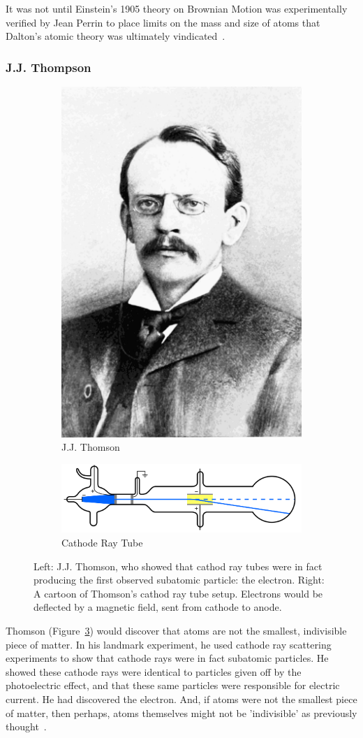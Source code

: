 It was not until Einstein's 1905 theory on Brownian Motion was experimentally
verified by Jean Perrin to place limits on the mass and size of atoms that
Dalton's atomic theory was ultimately vindicated~\cite{Patterson200750}.

\subsubsection{J.J. Thompson}

\begin{figure}[ht]
	\centering
	\begin{subfigure}{.4\textwidth}
		\centering
		\includegraphics[width=0.4\linewidth]{../Chapter2/fig/jjthomson.png}
		\caption{J.J. Thomson}
		\label{fig:thomsonportrait}
	\end{subfigure}%
	\begin{subfigure}{0.6\textwidth}
		\centering
		\includegraphics[width=0.4\linewidth]{../Chapter2/fig/cathoderaytube.png}
		\caption{Cathode Ray Tube}
		\label{fig:thomsoncathode}
	\end{subfigure}
	\caption{ 
		Left: J.J. Thomson, who showed that cathod ray tubes were in fact producing
		the first observed subatomic particle: the electron. Right: A cartoon of
		Thomson's cathod ray tube setup. Electrons would be deflected by a magnetic
		field, sent from cathode to anode.
	}
	\label{fig:jjthomson}
\end{figure}

Thomson (Figure~\ref{fig:jjthomson}) would discover that atoms are not the
smallest, indivisible piece of matter. In his landmark experiment, he used
cathode ray scattering experiments to show that cathode rays were in fact
subatomic particles. He showed these cathode rays were identical to particles
given off by the photoelectric effect, and that these same particles were
responsible for electric current. He had discovered the electron. And, if atoms
were not the smallest piece of matter, then perhaps, atoms themselves might not
be 'indivisible' as previously thought~\cite{nobelthomson2014}.


